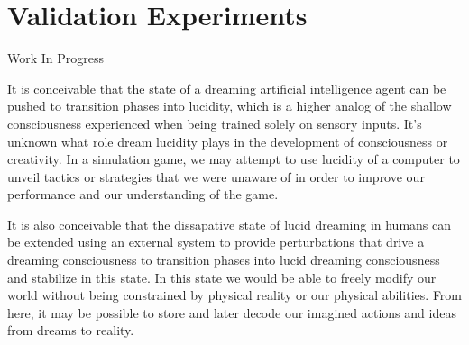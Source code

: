 \documentclass{article}
\begin{document}





\section{Validation Experiments}

Work In Progress 

It is conceivable that the state of a dreaming artificial intelligence agent can be pushed to transition phases into lucidity, which is a higher analog of the shallow consciousness experienced when being trained solely on sensory inputs. It's unknown what role dream lucidity plays in the development of consciousness or creativity. In a simulation game, we may attempt to use lucidity of a computer to unveil tactics or strategies that we were unaware of in order to improve our performance and our understanding of the game. 

It is also conceivable that the dissapative state of lucid dreaming in humans can be extended using an external system to provide perturbations that drive a dreaming consciousness to transition phases into lucid dreaming consciousness and stabilize in this state. In this state we would be able to freely modify our world without being constrained by physical reality or our physical abilities. From here, it may be possible to store and later decode our imagined actions and ideas from dreams to reality. 


\end{document}
